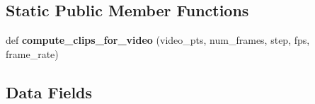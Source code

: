 \subsection*{Static Public Member Functions}
\begin{DoxyCompactItemize}
\item 
\mbox{\label{classtorchvision_1_1datasets_1_1video__utils_1_1VideoClips_a0bb31c2c87570544a06deeb26d33b894}} 
def {\bfseries compute\+\_\+clips\+\_\+for\+\_\+video} (video\+\_\+pts, num\+\_\+frames, step, fps, frame\+\_\+rate)
\end{DoxyCompactItemize}
\subsection*{Data Fields}
